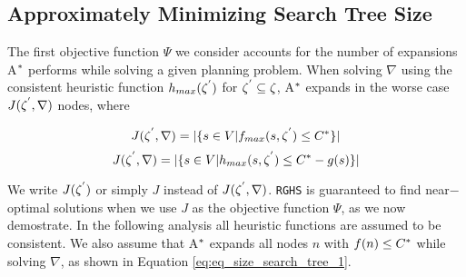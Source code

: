 \subsection{Approximately Minimizing Search Tree Size}
\noindent
The first objective function $\Psi$ we consider accounts for the number of expansions A$\sp{*}$ performs while solving a given planning problem. When solving $\nabla$ using the consistent heuristic function $h_{max}(\zeta\sp{'})$  for $\zeta\sp{'} \subseteq \zeta$, A$\sp{*}$ expands in the worse case $J(\zeta\sp{'},\nabla)$ nodes, where

\begin{equation}
J(\zeta\sp{'},\nabla) = |\{s \in V | f_{max}(s,\zeta\sp{'}) \leq C\sp{*}\}|
\label{eq:eq_size_search_tree_1}
\end{equation}
\begin{equation}
J(\zeta\sp{'},\nabla) = |\{s \in V | h_{max}(s,\zeta\sp{'}) \leq C\sp{*} - g(s)\}|
\label{eq:eq_size_search_tree_2}
\end{equation}

We write $J(\zeta\sp{'})$ or simply $J$ instead of $J(\zeta\sp{'},\nabla)$. \texttt{RGHS} is guaranteed to find near$-$optimal solutions when we use $J$ as the objective function $\Psi$, as we now demostrate. In the following analysis all heuristic functions are assumed to be consistent. We also assume that A$\sp{*}$ expands all nodes $n$ with $f(n) \leq C\sp{*}$ while solving $\nabla$, as shown in Equation \ref{eq:eq_size_search_tree_1}.

